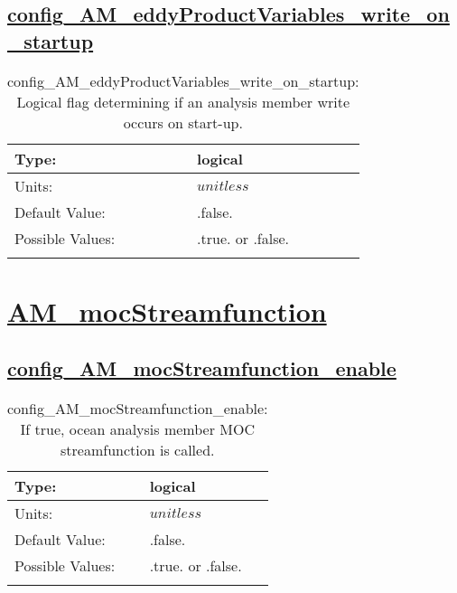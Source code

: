 \subsection[config\_AM\_eddyProductVariables\_write\_on\_startup]{\hyperref[sec:nm_tab_AM_eddyProductVariables]{config\_AM\_eddyProductVariables\_write\_on\_startup}}
\label{subsec:nm_sec_config_AM_eddyProductVariables_write_on_startup}
\begin{center}
\begin{longtable}{| p{2.0in} || p{4.0in} |}
    \hline
    Type: & logical \\
    \hline
    Units: & $unitless$ \\
    \hline
    Default Value: & .false. \\
    \hline
    Possible Values: & .true. or .false. \\
    \hline
    \caption{config\_AM\_eddyProductVariables\_write\_on\_startup: Logical flag determining if an analysis member write occurs on start-up.}
\end{longtable}
\end{center}
\section[AM\_mocStreamfunction]{\hyperref[sec:nm_tab_AM_mocStreamfunction]{AM\_mocStreamfunction}}
\label{sec:nm_sec_AM_mocStreamfunction}
\subsection[config\_AM\_mocStreamfunction\_enable]{\hyperref[sec:nm_tab_AM_mocStreamfunction]{config\_AM\_mocStreamfunction\_enable}}
\label{subsec:nm_sec_config_AM_mocStreamfunction_enable}
\begin{center}
\begin{longtable}{| p{2.0in} || p{4.0in} |}
    \hline
    Type: & logical \\
    \hline
    Units: & $unitless$ \\
    \hline
    Default Value: & .false. \\
    \hline
    Possible Values: & .true. or .false. \\
    \hline
    \caption{config\_AM\_mocStreamfunction\_enable: If true, ocean analysis member MOC streamfunction is called.}
\end{longtable}
\end{center}
